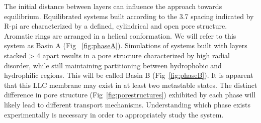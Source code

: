 The initial distance between layers can influence the approach towards
equilibrium. Equilibrated systems built according to the 3.7 \angstrom
spacing indicated by R-pi are characterized by a defined, cylindrical and
open pore structure. Aromatic rings are arranged in a helical conformation.
We will refer to this system as Basin A (Fig ~\ref{fig:phaseA}). Simulations
of systems built with layers stacked > 4 \angstrom apart results in a pore
structure characterized by high radial disorder, while still maintaining 
partitioning between hydrophobic and hydrophilic regions. This will be 
called Basin B (Fig~\ref{fig:phaseB}). It is apparent that this LLC membrane
may exist in at least two metastable states. The distinct difference in 
pore structure (Fig~\ref{fig:porestructures}) exhibited by each phase will
likely lead to different transport mechanisms. Understanding which phase 
exists experimentally is necessary in order to appropriately study the system.

